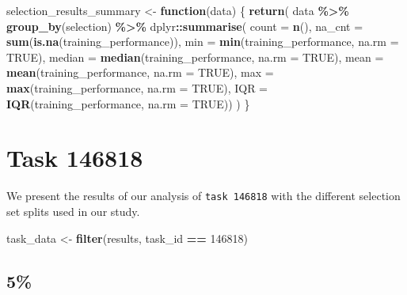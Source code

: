 \documentclass[
]{book}
\newenvironment{Shaded}{\begin{snugshade}}{\end{snugshade}}
\newcommand{\AttributeTok}[1]{\textcolor[rgb]{0.13,0.29,0.53}{#1}}
\newcommand{\ConstantTok}[1]{\textcolor[rgb]{0.56,0.35,0.01}{#1}}
\newcommand{\ControlFlowTok}[1]{\textcolor[rgb]{0.13,0.29,0.53}{\textbf{#1}}}
\newcommand{\DecValTok}[1]{\textcolor[rgb]{0.00,0.00,0.81}{#1}}
\newcommand{\FunctionTok}[1]{\textcolor[rgb]{0.13,0.29,0.53}{\textbf{#1}}}
\newcommand{\NormalTok}[1]{#1}
\newcommand{\OtherTok}[1]{\textcolor[rgb]{0.56,0.35,0.01}{#1}}
\newcommand{\SpecialCharTok}[1]{\textcolor[rgb]{0.81,0.36,0.00}{\textbf{#1}}}
\begin{document}
\begin{Shaded}
\begin{Highlighting}[]
\NormalTok{selection\_results\_summary }\OtherTok{\textless{}{-}} \ControlFlowTok{function}\NormalTok{(data) \{}
    \FunctionTok{return}\NormalTok{(}
\NormalTok{        data }\SpecialCharTok{\%\textgreater{}\%}
        \FunctionTok{group\_by}\NormalTok{(selection) }\SpecialCharTok{\%\textgreater{}\%}
\NormalTok{        dplyr}\SpecialCharTok{::}\FunctionTok{summarise}\NormalTok{(}
            \AttributeTok{count =} \FunctionTok{n}\NormalTok{(),}
            \AttributeTok{na\_cnt =} \FunctionTok{sum}\NormalTok{(}\FunctionTok{is.na}\NormalTok{(training\_performance)),}
            \AttributeTok{min =} \FunctionTok{min}\NormalTok{(training\_performance, }\AttributeTok{na.rm =} \ConstantTok{TRUE}\NormalTok{),}
            \AttributeTok{median =} \FunctionTok{median}\NormalTok{(training\_performance, }\AttributeTok{na.rm =} \ConstantTok{TRUE}\NormalTok{),}
            \AttributeTok{mean =} \FunctionTok{mean}\NormalTok{(training\_performance, }\AttributeTok{na.rm =} \ConstantTok{TRUE}\NormalTok{),}
            \AttributeTok{max =} \FunctionTok{max}\NormalTok{(training\_performance, }\AttributeTok{na.rm =} \ConstantTok{TRUE}\NormalTok{),}
            \AttributeTok{IQR =} \FunctionTok{IQR}\NormalTok{(training\_performance, }\AttributeTok{na.rm =} \ConstantTok{TRUE}\NormalTok{))}
\NormalTok{    )}
\NormalTok{\}}
\end{Highlighting}
\end{Shaded}

\hypertarget{task-146818}{%
\chapter{Task 146818}\label{task-146818}}

We present the results of our analysis of \texttt{task\ 146818} with the different selection set splits used in our study.

\begin{Shaded}
\begin{Highlighting}[]
\NormalTok{task\_data }\OtherTok{\textless{}{-}} \FunctionTok{filter}\NormalTok{(results, task\_id }\SpecialCharTok{==} \DecValTok{146818}\NormalTok{)}
\end{Highlighting}
\end{Shaded}

\hypertarget{section}{%
\section{5\%}\label{section}}
\end{document}
